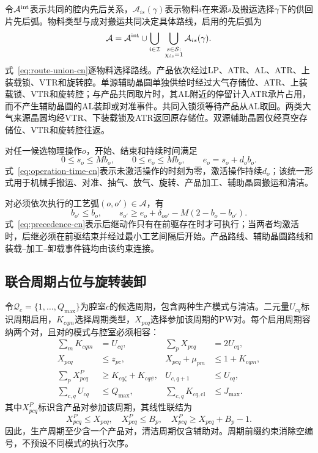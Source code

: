 \documentclass[final,5p,times,twocolumn]{elsarticle}
\begin{document}
令$\mathcal A^{\rm int}$表示共同的腔内先后关系，$\mathcal A_{is}(\gamma)$表示物料$i$在来源$s$及搬运选择$\gamma$下的供回片先后弧。物料类型与成对搬运共同决定具体路线，启用的先后弧为
\begin{equation}
\mathcal A=\mathcal A^{\rm int}\cup
\bigcup_{i\in\mathcal I}\ \bigcup_{\substack{s\in\mathcal S:\\ \chi_{is}=1}}\mathcal A_{is}(\gamma).
\label{eq:route-union-cn}
\end{equation}
式~\eqref{eq:route-union-cn}逐物料选择路线。产品依次经过LP、ATR、AL、ATR、上装载锁、VTR和旋转腔。单源辅助晶圆单独供给时经过大气存储位、ATR、上装载锁、VTR和旋转腔；与产品共同取片时，其AL附近的停留计入ATR承片占用，而不产生辅助晶圆的AL装卸或对准事件。共同入锁须等待产品从AL取回。两类大气来源晶圆均经VTR、下装载锁及ATR返回原存储位。双源辅助晶圆仅经真空存储位、VTR和旋转腔往返。



对任一候选物理操作$o$，开始、结束和持续时间满足
\begin{equation}
0\le s_o\le Mb_o,\qquad
0\le e_o\le Mb_o,\qquad
e_o=s_o+d_ob_o.
\label{eq:operation-time-cn}
\end{equation}
式~\eqref{eq:operation-time-cn}表示未激活操作的时刻为零，激活操作持续$d_o$；该统一形式用于机械手搬运、对准、抽气、放气、旋转、产品加工、辅助晶圆搬运和清洁。

对必须依次执行的工艺弧$(o,o')\in\mathcal A$，有
\begin{equation}
b_{o'}\le b_o,\qquad
s_{o'}\ge e_o+\delta_{oo'}-M(2-b_o-b_{o'}).
\label{eq:precedence-cn}
\end{equation}
式~\eqref{eq:precedence-cn}表示后继动作只有在前驱存在时才可执行；当两者均激活时，后继必须在前驱结束并经过最小工艺间隔后开始。产品路线、辅助晶圆路线和装载--加工--卸载事件链均由该约束连接。

\subsection{联合周期占位与旋转装卸}

令$\mathcal Q_c=\{1,\ldots,Q_{\max}\}$为腔室$c$的候选周期，包含两种生产模式与清洁。二元量$U_{cq}$标识周期启用，$K_{cqm}$选择周期类型，$X_{pcq}$选择参加该周期的PW对。每个启用周期容纳两个对，且对的模式与腔室必须相容：
\begin{equation}
\begin{aligned}
\sum_mK_{cqm}&=U_{cq}, &\sum_pX_{pcq}&=2U_{cq},\\
X_{pcq}&\le z_{pc}, &X_{pcq}+\mu_{pm}&\le1+K_{cqm},\\
\sum_pX^P_{pcq}&\ge K_{cq\zeta}+K_{cq\psi}, &U_{c,q+1}&\le U_{cq},\\
\sum_{c,q}U_{cq}&\le Q_{\max}, &\sum_{c,q}K_{cq,\mathrm{cl}}&\le J_{\max}.
\end{aligned}
\label{eq:cycle-capacity-cn}
\end{equation}
其中$X^P_{pcq}$标识含产品对参加该周期，其线性联结为
\begin{equation}
X^P_{pcq}\le X_{pcq},\quad X^P_{pcq}\le B_p,\quad
X^P_{pcq}\ge X_{pcq}+B_p-1.
\label{eq:cycle-products-cn}
\end{equation}
因此，生产周期至少含一个产品对，清洁周期仅含辅助对。周期前缀约束消除空编号，不预设不同模式的执行次序。
\end{document}
